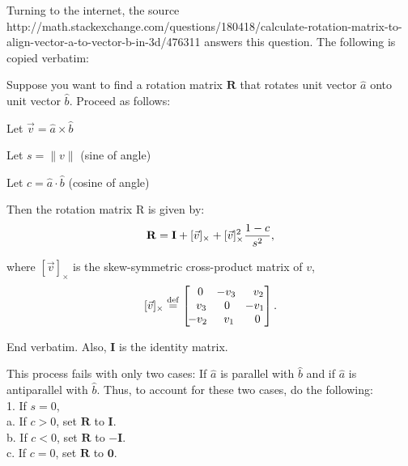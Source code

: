 \documentclass[12pt]{article}
\newcommand{\spaces}{\phantom{\qquad}}
\begin{document}
	Turning to the internet, the source http://math.stackexchange.com/questions/180418/calculate-rotation-matrix-to-align-vector-a-to-vector-b-in-3d/476311 answers this question. The following is copied verbatim:
	
	Suppose you want to find a rotation matrix $\mathbf{R}$ that rotates unit vector $\hat{a}$ onto unit vector $\hat{b}$. Proceed as follows:

	Let $\vec{v} = \hat{a} \times \hat{b}$

	Let $s = \|v\|$ (sine of angle)

	Let $c = \hat{a} \cdot \hat{b}$ (cosine of angle)

	Then the rotation matrix R is given by:
		$$\mathbf{R} = \mathbf{I} + [\vec{v}]_{\times} + [\vec{v}]_{\times}^2{1-c \over s^2},$$

	where $[\vec{v}]_{\times}$ is the skew-symmetric cross-product matrix of $v$,
	$$[\vec{v}]_{\times} \stackrel{\rm def}{=} \begin{bmatrix}
		\,\,0 & \!-v_3 & \,\,\,v_2\\
		\,\,\,v_3 & 0 & \!-v_1\\
		\!-v_2 & \,\,v_1 &\,\,0
	\end{bmatrix}.$$
	
	End verbatim. Also, $\mathbf{I}$ is the identity matrix.

	This process fails with only two cases: If $\hat{a}$ is parallel with $\hat{b}$ and if $\hat{a}$ is antiparallel with $\hat{b}$. Thus, to account for these two cases, do the following: \\
	\spaces 1. If $s = 0$,\\
	\spaces\spaces a. If $c > 0$, set $\mathbf{R}$ to $\mathbf{I}$.\\
	\spaces\spaces b. If $c < 0$, set $\mathbf{R}$ to $-\mathbf{I}$.\\
	\spaces\spaces c. If $c = 0$, set $\mathbf{R}$ to $\mathbf{0}$.
	
\end{document}

